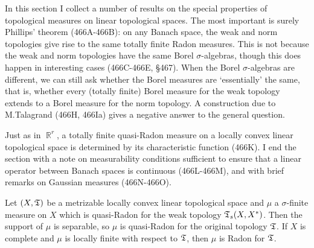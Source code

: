 
\def\chaptername{Pointwise compact sets of measurable functions}
\def\sectionname{Measures on linear topological spaces}


In this section I collect a number of results on the special properties
of topological measures on linear topological spaces.   The most
important is surely Phillips' theorem (466A-466B):  on any Banach space,
the weak and norm topologies give rise to the same totally finite Radon
measures.   This is not because the weak and norm topologies have the
same Borel $\sigma$-algebras, though this does happen
in interesting cases (466C-466E, \S467).   When the Borel
$\sigma$-algebras are different, we can still
ask whether the Borel measures
are `essentially' the same, that is, whether every (totally finite)
Borel measure for the weak topology extends to a Borel measure for the
norm topology.   A construction due to M.Talagrand (466H, 466Ia) gives a
negative answer to the general question.

Just as in $\BbbR^r$, a totally finite quasi-Radon measure on a locally
convex linear topological space is determined by its characteristic
function (466K).   I end the section with a note on measurability
conditions sufficient to ensure that a linear operator between Banach
spaces is continuous (466L-466M), and with brief remarks on Gaussian
measures (466N-466O).

 Let $(X,\frak T)$ be a metrizable locally convex
linear topological space and $\mu$ a
$\sigma$-finite measure on $X$ which is quasi-Radon for the weak
topology $\frak T_s(X,X^*)$.   Then the support of $\mu$ is
separable, so $\mu$ is quasi-Radon for the original topology $\frak T$.
If $X$ is complete and $\mu$ is locally finite with respect to
$\frak T$, then $\mu$ is Radon for $\frak T$.


